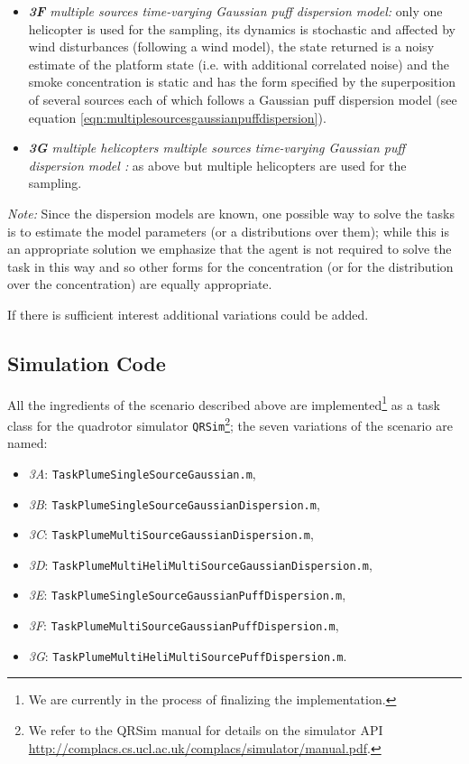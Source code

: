 \documentclass{article}
\newcommand\mytexttt[1]{\texttt{\hyphenchar\font=45\relax #1}}
\newcommand{\webman}{\url{http://complacs.cs.ucl.ac.uk/complacs/simulator/manual.pdf}\xspace}
\begin{document}
\begin{itemize}
\item \textit{\textbf{3F} multiple sources time-varying Gaussian puff dispersion model:} only one helicopter is used for the sampling, its dynamics is stochastic and affected by wind disturbances (following a wind model), the state returned is a noisy estimate of the platform state (i.e. with additional correlated noise) and the smoke concentration is static and has the form specified by the superposition of several sources each of which follows a Gaussian puff dispersion model (see equation \ref{eqn:multiplesourcesgaussianpuffdispersion}).

\item \textit{\textbf{3G} multiple helicopters multiple sources time-varying Gaussian puff dispersion model :} as above but multiple helicopters are used for the sampling.

\end{itemize}

\textit{Note:}
Since the dispersion models are known, one possible way to solve the tasks is to estimate the model parameters (or a distributions over them); while this is an appropriate solution we emphasize that the agent is not required to solve the task in this way and so other forms for the concentration (or for the distribution over the concentration) are equally appropriate.  

If there is sufficient interest additional variations could be added.

\subsection{Simulation Code} \label{PlumeSim}

All the ingredients of the scenario described above are implemented\footnote{We are currently in the process of finalizing the implementation.} as a task class for the quadrotor simulator \texttt{QRSim}\footnote{We refer to the QRSim manual for details on the simulator API \webman.}; the seven variations of the scenario are named:
\begin{itemize}
\item\textit{3A}: \mytexttt{TaskPlumeSingleSourceGaussian.m}, 
\item\textit{3B}: \mytexttt{TaskPlumeSingleSourceGaussianDispersion.m},
\item\textit{3C}: \mytexttt{TaskPlumeMultiSourceGaussianDispersion.m}, 
\item\textit{3D}: \mytexttt{TaskPlumeMultiHeliMultiSourceGaussianDispersion.m}, 
\item\textit{3E}: \mytexttt{TaskPlumeSingleSourceGaussianPuffDispersion.m}, 
\item\textit{3F}: \mytexttt{TaskPlumeMultiSourceGaussianPuffDispersion.m},
\item\textit{3G}: \mytexttt{TaskPlumeMultiHeliMultiSourcePuffDispersion.m}. 
\end{itemize}
\end{document}
